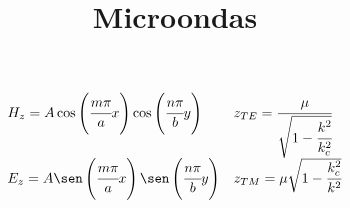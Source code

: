 \documentclass[12pt]{article}
\title{Microondas}
\begin{document}
$$
\begin{array}{ll}
	H_z = A \cos\left(\cfrac{m\pi}{a}x\right) \cos\left(\cfrac{n\pi}{b}y\right) & z_{TE} = \cfrac{\mu}{\sqrt{1-\cfrac{k^2}{k^2_c}}}\\
	E_z = A\sen\left(\cfrac{m\pi}{a}x\right)\sen\left(\cfrac{n\pi}{b}y\right) & z_{TM} = \mu\sqrt{1-\cfrac{k^2_c}{k^2}}
\end{array}
$$
\end{document}
